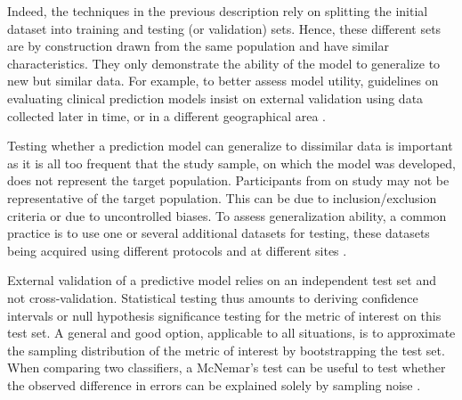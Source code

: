 \documentclass[../../../main.tex]{subfiles}
\begin{document}
Indeed, the techniques in the previous description rely on splitting the initial dataset into training and testing (or validation) sets. Hence, these different sets are by construction drawn from the same population and have similar characteristics. They only demonstrate the ability of the model to generalize to new but similar data. For example, to better assess model utility, guidelines on evaluating clinical prediction models insist on external validation using data collected later in time, or in a different geographical area \autocite{Varoquaux2023}.

Testing whether a prediction model can generalize to dissimilar data is important as it is all too frequent that the study sample, on which the model was developed, does not represent the target population. Participants from on study may not be representative of the target population. This can be due to inclusion/exclusion criteria or due to uncontrolled biases. To assess generalization ability, a common practice is to use one or several additional datasets for testing, these datasets being acquired using different protocols and at different sites \autocite{Varoquaux2023}.

External validation of a predictive model relies on an independent test set and not cross-validation. Statistical testing thus amounts to deriving confidence intervals or null hypothesis significance testing for the metric of interest on this test set. A general and good option, applicable to all situations, is to approximate the sampling distribution of the metric of interest by bootstrapping the test set. When comparing two classifiers, a McNemar's test can be useful to test whether the observed difference in errors can be explained solely by sampling noise \autocite{Varoquaux2023}.
\end{document}
